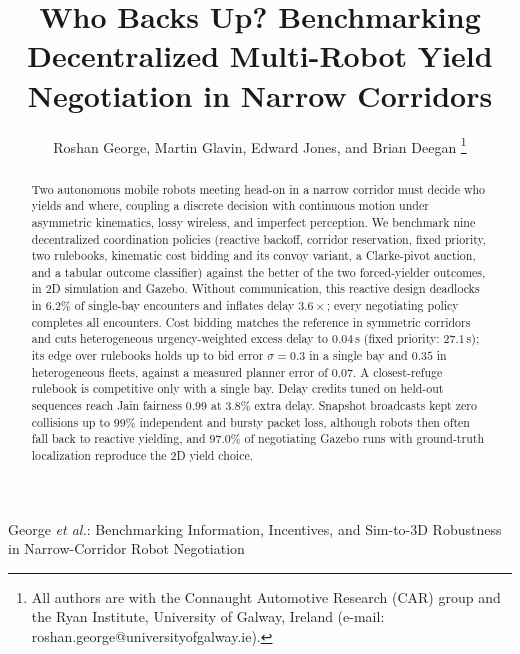 \documentclass[lettersize,journal]{IEEEtran}
\begin{document}

\title{Who Backs Up? Benchmarking Decentralized Multi-Robot Yield Negotiation in Narrow Corridors}


\author{Roshan George, Martin Glavin, Edward Jones, and Brian Deegan%
\thanks{All authors are with the Connaught Automotive Research (CAR) group and the Ryan Institute, University of Galway, Ireland (e-mail: roshan.george@universityofgalway.ie).}}

%
{George \MakeLowercase{\textit{et al.}}: Benchmarking Information, Incentives, and Sim-to-3D Robustness in Narrow-Corridor Robot Negotiation}

\maketitle

\begin{abstract}
Two autonomous mobile robots meeting head-on in a narrow corridor must decide who yields and where, coupling a discrete decision with continuous motion under asymmetric kinematics, lossy wireless, and imperfect perception. We benchmark nine decentralized coordination policies (reactive backoff, corridor reservation, fixed priority, two rulebooks, kinematic cost bidding and its convoy variant, a Clarke-pivot auction, and a tabular outcome classifier) against the better of the two forced-yielder outcomes, in 2D simulation and Gazebo. Without communication, this reactive design deadlocks in $6.2\%$ of single-bay encounters and inflates delay $3.6\times$; every negotiating policy completes all encounters. Cost bidding matches the reference in symmetric corridors and cuts heterogeneous urgency-weighted excess delay to $0.04$\,s (fixed priority: $27.1$\,s); its edge over rulebooks holds up to bid error $\sigma=0.3$ in a single bay and $0.35$ in heterogeneous fleets, against a measured planner error of $0.07$. A closest-refuge rulebook is competitive only with a single bay. Delay credits tuned on held-out sequences reach Jain fairness $0.99$ at $3.8\%$ extra delay. Snapshot broadcasts kept zero collisions up to $99\%$ independent and bursty packet loss, although robots then often fall back to reactive yielding, and $97.0\%$ of negotiating Gazebo runs with ground-truth localization reproduce the 2D yield choice.
\end{abstract}
\end{document}
